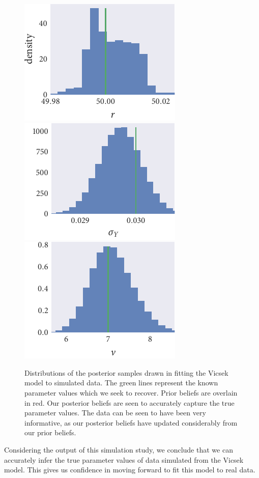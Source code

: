 \begin{figure}[tbp]
  \includegraphics{r_hist_r.pdf}%
  \includegraphics{r_hist_sigma_Y.pdf}%
  \includegraphics{r_hist_nu.pdf}
  \caption{Distributions of the posterior samples drawn in fitting the Vicsek
    model to simulated data. The green lines represent the known parameter
    values which we seek to recover. Prior beliefs are overlain in red. Our
    posterior beliefs are seen to accurately capture the true parameter values. The data can be seen to have been very informative, as our posterior
    beliefs have updated considerably from our prior beliefs.}
  \label{fig:vicsek_hist}
\end{figure}

Considering the output of this simulation study, we conclude that we can
accurately infer the true parameter values of data simulated from the Vicsek
model. This gives us confidence in moving forward to fit this model to real
data.

